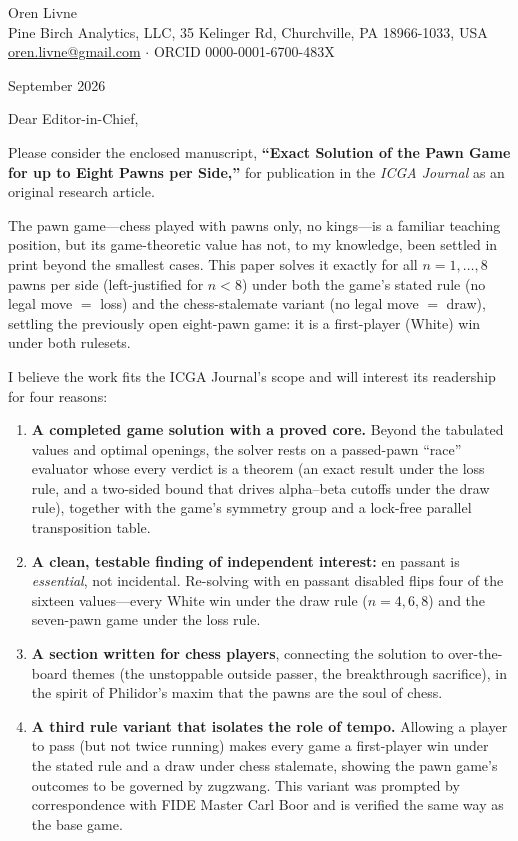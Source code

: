 \documentclass[11pt]{article}
\begin{document}
\noindent Oren Livne\\
Pine Birch Analytics, LLC, 35 Kelinger Rd, Churchville, PA 18966-1033, USA\\
\href{mailto:oren.livne@gmail.com}{oren.livne@gmail.com} $\cdot$ ORCID 0000-0001-6700-483X

\vspace{1em}
 September 2026

\vspace{1em}
\noindent Dear Editor-in-Chief,

\vspace{0.5em}
Please consider the enclosed manuscript, \textbf{``Exact Solution of the Pawn Game
for up to Eight Pawns per Side,''} for publication in the \emph{ICGA Journal} as an
original research article.

The pawn game---chess played with pawns only, no kings---is a familiar teaching
position, but its game-theoretic value has not, to my knowledge, been settled in
print beyond the smallest cases. This paper solves it exactly for all
$n = 1,\dots,8$ pawns per side (left-justified for $n<8$) under both the game's
stated rule (no legal move $=$ loss) and the chess-stalemate variant (no legal move
$=$ draw), settling the previously open eight-pawn game: it is a first-player
(White) win under both rulesets.

I believe the work fits the ICGA Journal's scope and will interest its readership
for four reasons:

\begin{enumerate}[leftmargin=*]
\item \textbf{A completed game solution with a proved core.} Beyond the tabulated
values and optimal openings, the solver rests on a passed-pawn ``race'' evaluator
whose every verdict is a theorem (an exact result under the loss rule, and a
two-sided bound that drives alpha--beta cutoffs under the draw rule), together with
the game's symmetry group and a lock-free parallel transposition table.

\item \textbf{A clean, testable finding of independent interest:} en passant is
\emph{essential}, not incidental. Re-solving with en passant disabled flips four of
the sixteen values---every White win under the draw rule ($n = 4, 6, 8$) and the
seven-pawn game under the loss rule.

\item \textbf{A section written for chess players}, connecting the solution to
over-the-board themes (the unstoppable outside passer, the breakthrough sacrifice),
in the spirit of Philidor's maxim that the pawns are the soul of chess.

\item \textbf{A third rule variant that isolates the role of tempo.} Allowing a
player to pass (but not twice running) makes every game a first-player win under the
stated rule and a draw under chess stalemate, showing the pawn game's outcomes to be
governed by zugzwang. This variant was prompted by correspondence with FIDE Master
Carl Boor and is verified the same way as the base game.
\end{enumerate}
\end{document}

